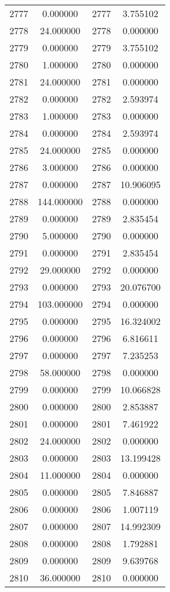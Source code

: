 \documentclass[12pt]{article}
\begin{document}
\begin{longtable}{@{}cccc@{}}
2777 & 0.000000 & 2777 & 3.755102 \\
2778 & 24.000000 & 2778 & 0.000000 \\
2779 & 0.000000 & 2779 & 3.755102 \\
2780 & 1.000000 & 2780 & 0.000000 \\
2781 & 24.000000 & 2781 & 0.000000 \\
2782 & 0.000000 & 2782 & 2.593974 \\
2783 & 1.000000 & 2783 & 0.000000 \\
2784 & 0.000000 & 2784 & 2.593974 \\
2785 & 24.000000 & 2785 & 0.000000 \\
2786 & 3.000000 & 2786 & 0.000000 \\
2787 & 0.000000 & 2787 & 10.906095 \\
2788 & 144.000000 & 2788 & 0.000000 \\
2789 & 0.000000 & 2789 & 2.835454 \\
2790 & 5.000000 & 2790 & 0.000000 \\
2791 & 0.000000 & 2791 & 2.835454 \\
2792 & 29.000000 & 2792 & 0.000000 \\
2793 & 0.000000 & 2793 & 20.076700 \\
2794 & 103.000000 & 2794 & 0.000000 \\
2795 & 0.000000 & 2795 & 16.324002 \\
2796 & 0.000000 & 2796 & 6.816611 \\
2797 & 0.000000 & 2797 & 7.235253 \\
2798 & 58.000000 & 2798 & 0.000000 \\
2799 & 0.000000 & 2799 & 10.066828 \\
2800 & 0.000000 & 2800 & 2.853887 \\
2801 & 0.000000 & 2801 & 7.461922 \\
2802 & 24.000000 & 2802 & 0.000000 \\
2803 & 0.000000 & 2803 & 13.199428 \\
2804 & 11.000000 & 2804 & 0.000000 \\
2805 & 0.000000 & 2805 & 7.846887 \\
2806 & 0.000000 & 2806 & 1.007119 \\
2807 & 0.000000 & 2807 & 14.992309 \\
2808 & 0.000000 & 2808 & 1.792881 \\
2809 & 0.000000 & 2809 & 9.639768 \\
2810 & 36.000000 & 2810 & 0.000000 \\

\end{longtable}
\end{document}
